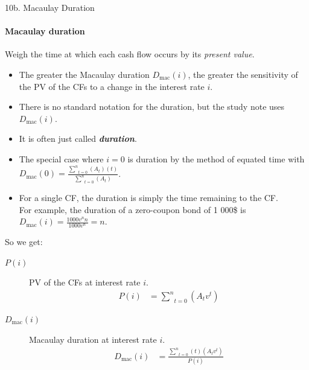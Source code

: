 \begin{CHPT_SUMM_AUTO}[label = {L.-10b}]{10b. Macaulay Duration}
\paragraph{Macaulay duration}	Weigh the time at which each cash flow occurs by its \textit{present value}.
	\begin{itemize}[leftmargin = *]
	\item	The greater the Macaulay duration $D_{\text{mac}}(i)$, the greater the sensitivity of the PV of the CFs to a change in the interest rate $i$.
	\item	There is no standard notation for the duration, but the study note uses $D_{\text{mac}}(i)$.
	\item	It is often just called \textbf{\textit{duration}}.
	\item	The special case where $i = 0$ is duration by the method of equated time with $D_{\text{mac}}(0) = \frac{\underset{t = 0}{\overset{n}{\sum}} (A_{t})(t)}{\underset{t = 0}{\overset{n}{\sum}} (A_{t})}$.
	\item	For a single CF, the duration is simply the time remaining to the CF.\\
			For example, the duration of a zero-coupon bond of 1 000\$ is $D_{\text{mac}}(i) = \frac{1000v^{n}n}{1000v^{n}} = n$.
	\end{itemize}
	
\tcbline
So we get:
\begin{description}
	\item[$P(i)$]	PV of the CFs at interest rate $i$.
		\begin{align*}
		P(i)	
		&=	\underset{t = 0}{\overset{n}{\sum}} (A_{t}v^{t})
		\end{align*}
	\item[$D_{\text{mac}}(i)$]	Macaulay duration at interest rate $i$.
		\begin{align*}
		D_{\text{mac}}(i)
		&=	\frac{\underset{t = 0}{\overset{n}{\sum}} (t) (A_{t}v^{t})}{P(i)}
		\end{align*}
\end{description}

\end{CHPT_SUMM_AUTO}

